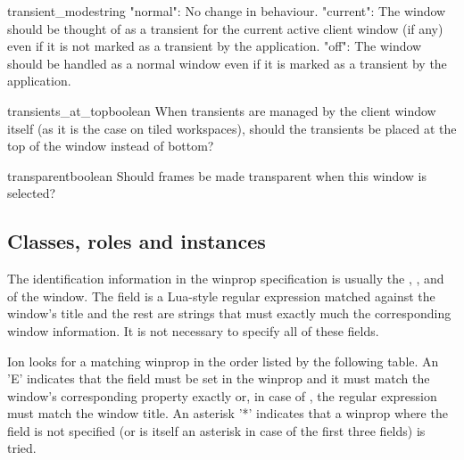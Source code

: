         
\begin{winprop}{transient_mode}{string}
    "normal": No change in behaviour. "current": The window
    should be thought of as a transient for the current active
    client window (if any) even if it is not marked as a
    transient by the application. "off": The window should be
    handled as a normal window even if it is marked as a
    transient by the application. 
\end{winprop}


\begin{winprop}{transients_at_top}{boolean}
    When transients are managed by the client window itself (as it
    is the case on tiled workspaces), should the transients be
    placed at the top of the window instead of bottom? 
\end{winprop}


\begin{winprop}{transparent}{boolean}
    Should frames be made transparent when this window is selected? \\
\end{winprop}



\subsection{Classes, roles and instances}
\label{sec:classesrolesinstances}

The identification information in the winprop specification is usually the
,
,
 and
of the window. The  field is a Lua-style regular expression
matched against the window's title and the rest are strings that must
exactly much the corresponding window information. It is not necessary
to specify all of these fields.

Ion looks for a matching winprop in the order listed by the following
table. An 'E' indicates that the field must be set in the winprop
and it must match the window's corresponding property exactly or, in
case of , the regular expression must match the window
title. An asterisk '*' indicates that a winprop where the field is
not specified (or is itself an asterisk in case of the first three
fields) is tried.

